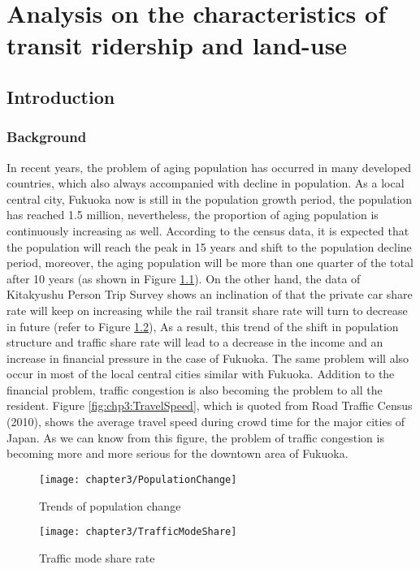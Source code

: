 \chapter{Analysis on the characteristics of transit ridership and land-use}
%
\section{Introduction}
%
\subsection{Background}
%
In recent years, the problem of aging population has occurred in many developed countries, which also always accompanied with decline in population. As a local central city, Fukuoka now is still in the population growth period, the population has reached 1.5 million, nevertheless, the proportion of aging population is continuously increasing as well. According to the census data, it is expected that the population will reach the peak in 15 years and shift to the population decline period, moreover, the aging population will be more than one quarter of the total after 10 years (as shown in Figure \ref{fig:chp3:PopulationChange}). On the other hand, the data of Kitakyushu Person Trip Survey shows an inclination of that the private car share rate will keep on increasing while the rail transit share rate will turn to decrease in future (refer to Figure \ref{fig:chp3:TrafficModeShare}), As a result, this trend of the shift in population structure and traffic share rate will lead to a decrease in the income and an increase in financial pressure in the case of Fukuoka. The same problem will also occur in most of the local central cities similar with Fukuoka. Addition to the financial problem, traffic congestion is also becoming the problem to all the resident. Figure \ref{fig:chp3:TravelSpeed}, which is quoted from Road Traffic Census (2010), shows the average travel speed during crowd time for the major cities of Japan. As we can know from this figure, the problem of traffic congestion is becoming more and more serious for the downtown area of Fukuoka.

%
\begin{figure}[htbp]
	\centering
	\texttt{[image: chapter3/PopulationChange]}
	\caption{Trends of population change}
	\label{fig:chp3:PopulationChange}
\end{figure}

%
\begin{figure}[htbp]
	\centering
	\texttt{[image: chapter3/TrafficModeShare]}
	\caption{Traffic mode share rate}
	\label{fig:chp3:TrafficModeShare}
\end{figure}

